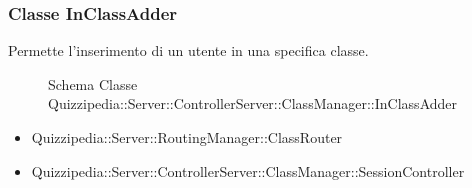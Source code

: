 \subsubsection{Classe InClassAdder}
Permette l'inserimento di un utente in una specifica classe.
\begin{figure}[H]
\centering
\noindent{}
\caption[Schema Classe InClassAdder]{Schema Classe Quizzipedia::Server::ControllerServer::ClassManager::InClassAdder}
\end{figure}
\begin{itemize}
\item Quizzipedia::Server::RoutingManager::ClassRouter
\end{itemize}
\begin{itemize}
\item Quizzipedia::Server::ControllerServer::ClassManager::SessionController
\end{itemize}
